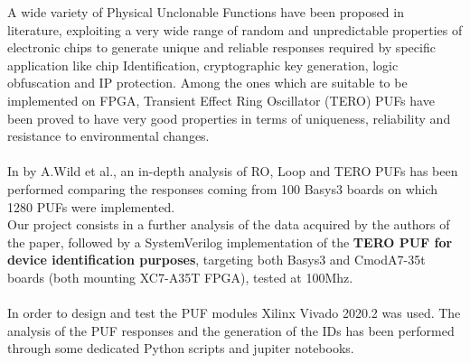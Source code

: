 
A wide variety of Physical Unclonable Functions have been proposed in literature, exploiting
a very wide range of random and unpredictable properties of electronic chips to generate unique and reliable
responses required by specific application like chip Identification, cryptographic key generation, logic obfuscation
and IP protection. Among the ones which are suitable to be implemented on FPGA, Transient Effect Ring Oscillator (TERO) 
PUFs have been proved to have very good properties in terms of uniqueness, reliability and resistance to
environmental changes.\\\\
In \cite{ref_pap} by A.Wild et al., an in-depth analysis of RO, Loop and TERO PUFs has been performed comparing
the responses coming from 100 Basys3 boards on which 1280 PUFs were implemented. \\
Our project consists in a further analysis of the data acquired by the authors of the paper, followed by a SystemVerilog
implementation of the \textbf{TERO PUF for device identification purposes}, targeting both Basys3 and CmodA7-35t boards 
(both mounting XC7-A35T FPGA), tested at 100Mhz. \\\\
In order to design and test the PUF modules Xilinx Vivado 2020.2 was used. The analysis of the PUF responses and
the generation of the IDs has been performed through some dedicated Python scripts and jupiter notebooks.\\
